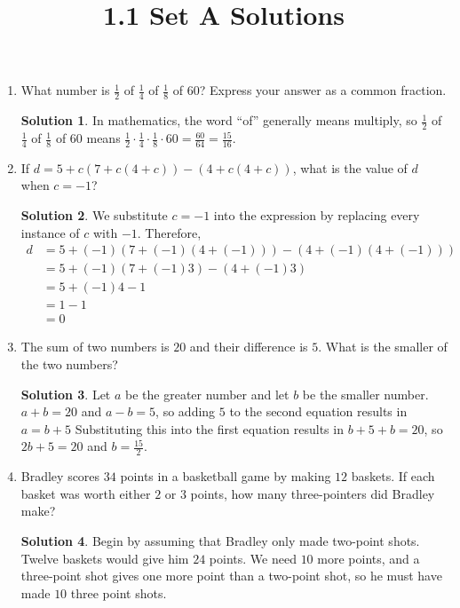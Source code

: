 \documentclass{article}
\title{1.1 Set A Solutions}
\author{}
\date{}
\theoremstyle{definition}
\newtheorem*{solution}{Solution}
\begin{document}
    \maketitle
    \begin{enumerate}
        \item What number is $\frac{1}{2}$ of $\frac{1}{4}$ of $\frac{1}{8}$ of
        $60$? Express your answer as a common fraction.
        \begin{solution}
            In mathematics, the word ``of'' generally means multiply, so
            $\frac{1}{2}$ of $\frac{1}{4}$ of $\frac{1}{8}$ of $60$ means
            $\frac{1}{2} \cdot \frac{1}{4} \cdot \frac{1}{8} \cdot 60 =
            \frac{60}{64} = \frac{15}{16}$.
        \end{solution}
        \item If $d = 5 + c(7 + c(4 + c)) - (4 + c(4 + c))$, what is the value
        of $d$ when $c = -1$?
        \begin{solution}
            We substitute $c = -1$ into the expression by replacing every
            instance of $c$ with $-1$. Therefore,
            \[\begin{split} d & = 5 + (-1)(7 + (-1)(4 + (-1))) - (4 + (-1)(4 +
                (-1))) \\
                & = 5 + (-1)(7 + (-1)3) - (4 + (-1)3) \\
                & = 5 + (-1)4 - 1 \\
                & = 1 - 1 \\
                & = 0 \end{split}\]
        \end{solution}
        \item The sum of two numbers is $20$ and their difference is $5$. What
        is the smaller of the two numbers?
        \begin{solution}
            Let $a$ be the greater number and let $b$ be the smaller number. $a
            + b = 20$ and $a - b = 5$, so adding $5$ to the second equation
            results in $a = b + 5$ Substituting this into the first equation
            results in $b + 5 + b = 20$, so $2b + 5 = 20$ and $b =
            \frac{15}{2}$.
        \end{solution}
        \item Bradley scores $34$ points in a basketball game by making $12$
        baskets. If each basket was worth either $2$ or $3$ points, how many
        three-pointers did Bradley make?
        \begin{solution}
            Begin by assuming that Bradley only made two-point shots. Twelve
            baskets would give him $24$ points. We need $10$ more points, and a
            three-point shot gives one more point than a two-point shot, so he
            must have made $10$ three point shots.


\end{solution}
\end{enumerate}
\end{document}
